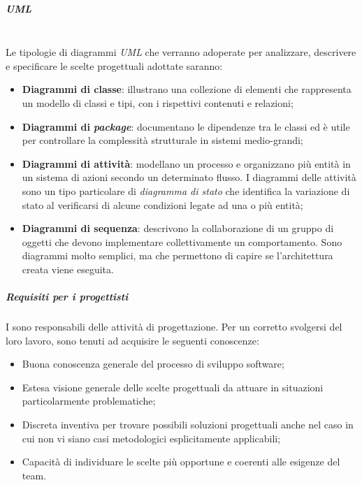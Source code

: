 	\subparagraph{UML}
	~\\Le tipologie di diagrammi \emph{UML} che verranno adoperate per analizzare, descrivere e specificare le scelte progettuali adottate saranno:
	\begin{itemize}
		\item \textbf{Diagrammi di classe}: illustrano una collezione di elementi che rappresenta un modello di classi e tipi, con i rispettivi contenuti e relazioni;
		\item \textbf{Diagrammi di } \emph{\textbf{package}}: documentano le dipendenze tra le classi ed è utile per controllare la complessità strutturale in sistemi medio-grandi;
		\item \textbf{Diagrammi di attività}: modellano un processo e organizzano più entità in un sistema di azioni secondo un determinato flusso. I diagrammi delle attività sono un tipo particolare di \emph{diagramma di stato} che identifica la variazione di stato al verificarsi di alcune condizioni legate ad una o più entità;
		\item \textbf{Diagrammi di sequenza}: descrivono la collaborazione di un gruppo di oggetti che devono implementare collettivamente un comportamento. Sono diagrammi molto semplici, ma che permettono di capire se l'architettura creata viene eseguita.
	\end{itemize}
	
	\subparagraph{Requisiti per i progettisti}
	I \progs{} sono responsabili delle attività di progettazione. Per un corretto svolgersi del loro lavoro, sono tenuti ad acquisire le seguenti conoscenze:
	\begin{itemize}
		\item Buona conoscenza generale del processo di sviluppo software;
		\item Estesa visione generale delle scelte progettuali da attuare in situazioni particolarmente problematiche;
		\item Discreta inventiva per trovare possibili soluzioni progettuali anche nel caso in cui non vi siano casi metodologici esplicitamente applicabili;
		\item Capacità di individuare le scelte più opportune e coerenti alle esigenze del team.
	\end{itemize}

